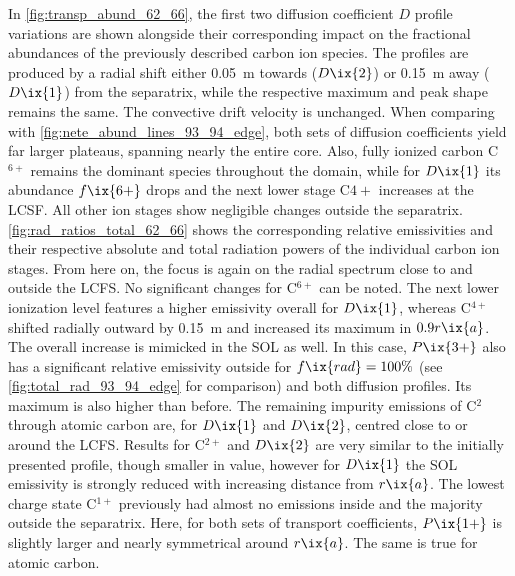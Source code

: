                 In \cref{fig:transp_abund_62_66}, the first two diffusion coefficient $D$ profile variations are shown alongside their corresponding impact on the fractional abundances of the previously described carbon ion species. The profiles are produced by a radial shift either \SI{0.05}{\meter} towards ($D\ix{2}$) or \SI{0.15}{\meter} away ($D\ix{1}$) from the separatrix, while the respective maximum and peak shape remains the same. The convective drift velocity is unchanged. When comparing with \cref{fig:nete_abund_lines_93_94_edge}, both sets of diffusion coefficients yield far larger plateaus, spanning nearly the entire core. Also, fully ionized carbon C$^{6+}$ remains the dominant species throughout the domain, while for $D\ix{1}$ its abundance $f\ix{6+}$ drops and the next lower stage C${4+}$ increases at the LCSF. All other ion stages show negligible changes outside the separatrix. \autoref{fig:rad_ratios_total_62_66} shows the corresponding relative emissivities and their respective absolute and total radiation powers of the individual carbon ion stages. From here on, the focus is again on the radial spectrum close to and outside the LCFS. No significant changes for C$^{6+}$ can be noted. The next lower ionization level features a higher emissivity overall for $D\ix{1}$, whereas C$^{4+}$ shifted radially outward by \SI{0.15}{\meter} and increased its maximum in $0.9r\ix{a}$. The overall increase is mimicked in the SOL as well. In this case, $P\ix{3+}$ also has a significant relative emissivity outside for $f\ix{rad}=100\%$ (see \cref{fig:total_rad_93_94_edge} for comparison) and both diffusion profiles. Its maximum is also higher than before. The remaining impurity emissions of C$^{2}$ through atomic carbon are, for $D\ix{1}$ and $D\ix{2}$, centred close to or around the LCFS. Results for C$^{2+}$ and $D\ix{2}$ are very similar to the initially presented profile, though smaller in value, however for $D\ix{1}$ the SOL emissivity is strongly reduced with increasing distance from $r\ix{a}$. The lowest charge state C$^{1+}$ previously had almost no emissions inside and the majority outside the separatrix. Here, for both sets of transport coefficients, $P\ix{1+}$ is slightly larger and nearly symmetrical around $r\ix{a}$. The same is true for atomic carbon.\\%
%

